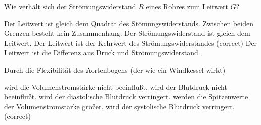 \documentclass[11pt]{exam}
\begin{document}
\begin{questions}
\vspace{3mm}\question Wie verhält sich der Strömungswiderstand \(R\) eines Rohres zum Leitwert \(G\)?

\begin{choices}
	\choice Der Leitwert ist gleich dem Quadrat des Stömungswiderstands.
	\choice Zwischen beiden Grenzen besteht kein Zusammenhang.
	\choice Der Strömungswiderstand ist gleich dem Leitwert.
	\choice Der Leitwert ist der Kehrwert des Strömungswiderstandes (correct)
	\choice Der Leitwert ist die Differenz aus Druck und Strömungswiderstand.
\end{choices}

\vspace{3mm}\question Durch die Flexibilität des Aortenbogens (der wie ein Windkessel wirkt)

\begin{choices}
	\choice wird die Volumenstromstärke nicht beeinflußt.
	\choice wird der Blutdruck nicht beeinflußt.
	\choice wird der diastolische Blutdruck verringert.
	\choice werden die Spitzenwerte der Volumenstromstärke größer.
	\choice wird der systolische Blutdruck verringert. (correct)
\end{choices}

\vspace{3mm}\end{questions}
\end{document}
